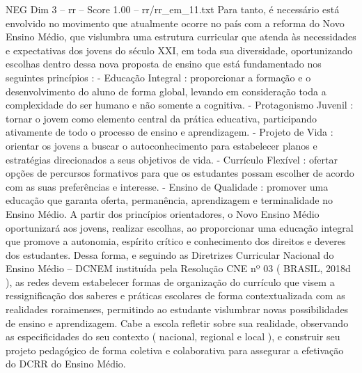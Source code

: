 \begin{textsample}{NEG Dim 3 – rr – Score 1.00 – rr/rr\_em\_11.txt}
Para tanto, é necessário está envolvido no movimento que atualmente ocorre no país com a reforma do Novo Ensino Médio, que vislumbra uma estrutura curricular que atenda às necessidades e expectativas dos jovens do século XXI, em toda sua diversidade, oportunizando escolhas dentro dessa nova proposta de ensino que está fundamentado nos seguintes princípios : - Educação Integral : proporcionar a formação e o desenvolvimento do aluno de forma global, levando em consideração toda a complexidade do ser humano e não somente a cognitiva. - Protagonismo Juvenil : tornar o jovem como elemento central da prática educativa, participando ativamente de todo o processo de ensino e aprendizagem. - Projeto de Vida : orientar os jovens a buscar o autoconhecimento para estabelecer planos e estratégias direcionados a seus objetivos de vida. - Currículo Flexível : ofertar opções de percursos formativos para que os estudantes possam escolher de acordo com as suas preferências e interesse. - Ensino de Qualidade : promover uma educação que garanta oferta, permanência, aprendizagem e terminalidade no Ensino Médio.
A partir dos princípios orientadores, o Novo Ensino Médio oportunizará aos jovens, realizar escolhas, ao proporcionar uma educação integral que promove a autonomia, espírito crítico e conhecimento dos direitos e deveres dos estudantes.
Dessa forma, e seguindo as Diretrizes Curricular Nacional do Ensino Médio – DCNEM instituída pela Resolução CNE nº 03 ( BRASIL, 2018d ), as redes devem estabelecer formas de organização do currículo que visem a ressignificação dos saberes e práticas escolares de forma contextualizada com as realidades roraimenses, permitindo ao estudante vislumbrar novas possibilidades de ensino e aprendizagem.
Cabe a escola refletir sobre sua realidade, observando as especificidades do seu contexto ( nacional, regional e local ), e construir seu projeto pedagógico de forma coletiva e colaborativa para assegurar a efetivação do DCRR do Ensino Médio.

\end{textsample}
